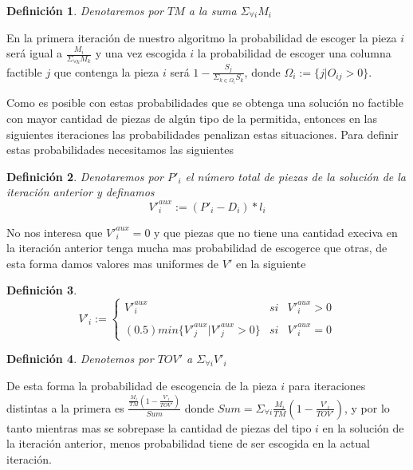 \documentclass[letterpaper,11pt]{article}
\newtheorem*{definicion}{Definici\'on}
\begin{document}
\begin{definicion}
Denotaremos por $TM$ a la suma $\Sigma _{\forall i} M_i$
\end{definicion}

En la primera iteraci\'on de nuestro algoritmo la probabilidad de escoger la pieza $i$ ser\'a igual a $\frac{M_i}{\Sigma _{\forall k}M_k}$ y una 
vez escogida $i$ la probabilidad de escoger una columna factible $j$ que contenga la pieza $i$ ser\'a $1-\frac{S_j}{\Sigma _{k\in \Omega _i}S_k}$, 
donde $\Omega _i:=\{j|O_{ij}>0\}$.

Como es posible con estas probabilidades que se obtenga una soluci\'on no factible con mayor cantidad de piezas de alg\'un tipo de la permitida, 
entonces en las siguientes iteraciones las probabilidades penalizan estas situaciones. Para definir estas probabilidades necesitamos las siguientes 

\begin{definicion}
Denotaremos por $P'_i$ el n\'umero total de piezas de la soluci\'on de la iteraci\'on anterior y definamos $$V'^{aux}_i:=(P'_i-D_i)*l_i$$
\end{definicion}

No nos interesa que $V'^{aux}_i=0$ y que piezas que no tiene una cantidad execiva en la iteraci\'on anterior tenga mucha mas probabilidad de 
escogerce que otras, de esta forma damos valores mas uniformes de $V'$ en la siguiente

\begin{definicion}
$$V'_i:=\left\{\begin{array}{lcc}
              V'^{aux}_i & si & V'^{aux}_i> 0 \\
             \\ (0.5)min\{V'^{aux}_j|V'^{aux}_j>0\}   & si & V'^{aux}_i=0
             \end{array}
      \right.  $$
\end{definicion}

\begin{definicion}
Denotemos por $TOV'$ a $\Sigma_{\forall i}V'_i$
\end{definicion}

De esta forma la probabilidad de escogencia de la pieza $i$ para iteraciones distintas a la primera es $\frac{\frac{M_i}{TM}(1-\frac{V'_i}{TOV'})}{Sum}$
donde $Sum=\Sigma _{\forall i} \frac{M_i}{TM}(1-\frac{V'_i}{TOV'})$, y por lo tanto mientras mas se sobrepase la cantidad de piezas del tipo $i$ en la 
soluci\'on de la iteraci\'on anterior, menos probabilidad tiene de ser escogida en la actual iteraci\'on.
\end{document}
